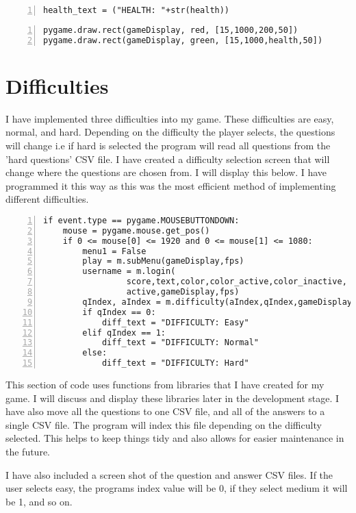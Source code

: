 \documentclass[12pt]{report}
\begin{document}
\begin{Verbatim}[numbers=left, frame=single]
health_text = ("HEALTH: "+str(health))
\end{Verbatim}

\begin{Verbatim}[numbers=left, frame=single]
pygame.draw.rect(gameDisplay, red, [15,1000,200,50])
pygame.draw.rect(gameDisplay, green, [15,1000,health,50])
\end{Verbatim}

\section{Difficulties}
I have implemented three difficulties into my game. These difficulties are easy, normal, and hard. Depending on the difficulty the player selects, the questions will change i.e if hard is selected the program will read all questions from the 'hard questions' CSV file. I have created a difficulty selection screen that will change where the questions are chosen from. I will display this below. I have programmed it this way as this was the most efficient method of implementing different difficulties. 

\begin{Verbatim}[numbers=left, frame=single]
if event.type == pygame.MOUSEBUTTONDOWN:
    mouse = pygame.mouse.get_pos()
    if 0 <= mouse[0] <= 1920 and 0 <= mouse[1] <= 1080:
        menu1 = False
        play = m.subMenu(gameDisplay,fps)
        username = m.login(
                 score,text,color,color_active,color_inactive,
                 active,gameDisplay,fps)
        qIndex, aIndex = m.difficulty(aIndex,qIndex,gameDisplay,fps)
        if qIndex == 0:
            diff_text = "DIFFICULTY: Easy"
        elif qIndex == 1:
            diff_text = "DIFFICULTY: Normal"
        else:
            diff_text = "DIFFICULTY: Hard"
\end{Verbatim}

This section of code uses functions from libraries that I have created for my game. I will discuss and display these libraries later in the development stage. I have also move all the questions to one CSV file, and all of the answers to a single CSV file. The program will index this file depending on the difficulty selected. This helps to keep things tidy and also allows for easier maintenance
in the future. 

I have also included a screen shot of the question and answer CSV files. If the user selects easy, the programs index value will be 0, if they select medium it will be 1, and so on.
\end{document}
